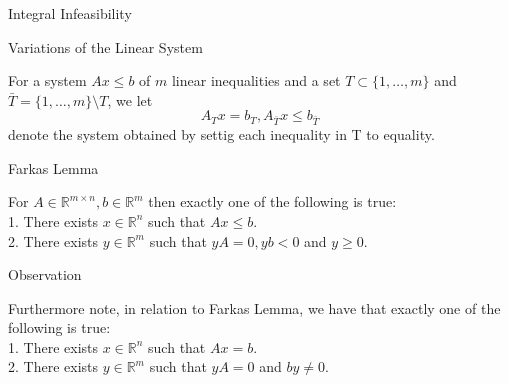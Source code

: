\documentclass{beamer}
\begin{document}




\begin{frame}{Integral Infeasibility}

	\begin{block}{Variations of the Linear System}

		For a system $Ax \leq b$ of $m$ linear inequalities and a set $T\subset \{1, \dots, m \}$ and $\bar{T} = \{1, \dots, m \} \setminus T$, we let
		\begin{equation}\label{eq:2}
		A_T x = b_T, A_{\bar{T}} x \leq b_{\bar{T}} 
		\end{equation} 
		denote the system obtained by settig each inequality in T to equality. 

	\end{block}

\end{frame}



\begin{frame}  %




	\begin{block}{Farkas Lemma}

		For $A \in \mathbb{R}^{m \times n}, b \in \mathbb{R}^{m}$ then exactly one of the following is true: \\
		1. There exists $x \in \mathbb{R}^n$ such that $Ax \leq b$. \\
		2. There exists $y \in \mathbb{R}^m$ such that $yA=0, yb<0$ and $y \geq 0$. 

	\end{block}

	\begin{block}{Observation}

		Furthermore note, in relation to Farkas Lemma, we have that exactly one of the following is true: \\
		1. There exists $x \in \mathbb{R}^n$ such that $Ax=b$. \\
		2. There exists $y \in \mathbb{R}^m$ such that $yA=0$ and $by \neq 0$.


	\end{block}

\end{frame}
\end{document}
